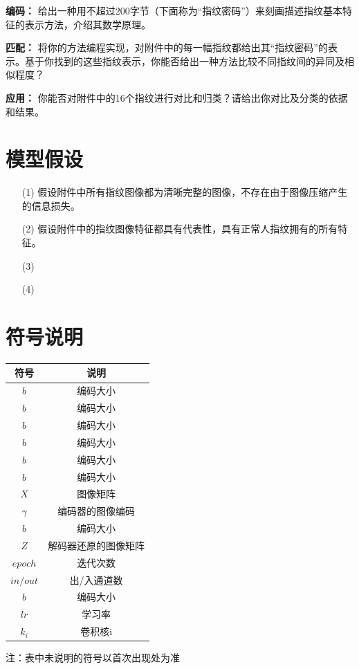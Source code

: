 \documentclass{whutmod}
\begin{document}
			\textbf{编码：} 给出一种用不超过200字节（下面称为“指纹密码”）来刻画描述指纹基本特征的表示方法，介绍其数学原理。
			
			\textbf{匹配：} 将你的方法编程实现，对附件中的每一幅指纹都给出其“指纹密码”的表示。基于你找到的这些指纹表示，你能否给出一种方法比较不同指纹间的异同及相似程度？
			
			\textbf{应用：} 你能否对附件中的16个指纹进行对比和归类？请给出你对比及分类的依据和结果。

	\section{模型假设}
		\begin{itemize}                                             
	\item [(1)] 假设附件中所有指纹图像都为清晰完整的图像，不存在由于图像压缩产生的信息损失。
\item [(2)] 假设附件中的指纹图像特征都具有代表性，具有正常人指纹拥有的所有特征。
		\item [(3)] 
		\item [(4)] 
		\end{itemize}

	\section{符号说明}
		\begin{table}[H]
		\centering
		\setlength{\tabcolsep}{12mm}
		\begin{tabular}{cc}
			\toprule[1.5pt]
			\multicolumn{1}{m{5cm}}{\centering 符号} & \multicolumn{1}{m{5cm}}{\centering 说明} \\
			\midrule[1pt]		
$b$  & 编码大小  \\ 
$b$  & 编码大小  \\ 
$b$  & 编码大小  \\ 
$b$  & 编码大小  \\ 
$b$  & 编码大小  \\ 
$b$  & 编码大小  \\ 
$X$  & 图像矩阵  \\ 
$\gamma$  & 编码器的图像编码  \\ 
$b$  & 编码大小  \\ 
$Z$  & 解码器还原的图像矩阵  \\ 
$epoch$  & 迭代次数  \\ 
$in/out$  & 出/入通道数  \\ 
  	$b$  & 编码大小  \\ 
$lr$  & 学习率  \\ 
$k_i$  & 卷积核i  \\ 
			\bottomrule[1.5pt]
		\end{tabular}
		\begin{tablenotes}
		\item 注：表中未说明的符号以首次出现处为准
		\end{tablenotes}
		\end{table}
	
\end{document}
